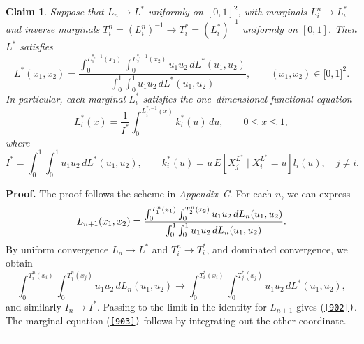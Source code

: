 \documentclass[onecolumn]{article}
\newtheorem{claim}[theorem]{Claim}
\newenvironment{proof}[1][Proof]{\noindent\textbf{#1.} }{\ \rule{0.5em}{0.5em}}
\begin{document}
\begin{claim}
\label{limit-FE} Suppose that $L_{n}\rightarrow L^{\ast }$ uniformly on $%
[0,1]^{2}$, with marginals $L_{i}^{n}\rightarrow L_{i}^{\ast }$ and inverse
marginals $T_{i}^{n}=(L_{i}^{n})^{-1}\rightarrow T_{i}^{\ast }=(L_{i}^{\ast
})^{-1}$ uniformly on $[0,1]$. Then $L^{\ast }$ satisfies 
\begin{equation}
L^{\ast }(x_{1},x_{2})=\frac{\int_{0}^{L_{1}^{\ast
,-1}(x_{1})}\int_{0}^{L_{2}^{\ast ,-1}(x_{2})}u_{1}u_{2}\,dL^{\ast
}(u_{1},u_{2})}{\int_{0}^{1}\int_{0}^{1}u_{1}u_{2}\,dL^{\ast }(u_{1},u_{2})}%
,\qquad (x_{1},x_{2})\in \lbrack 0,1]^{2}.  \label{902}
\end{equation}%
In particular, each marginal $L_{i}^{\ast }$ satisfies the one--dimensional
functional equation 
\begin{equation}
L_{i}^{\ast }(x)=\frac{1}{I^{\ast }}\int_{0}^{L_{i}^{\ast
,-1}(x)}k_{i}^{\ast }(u)\,du,\qquad 0\leq x\leq 1,  \label{903}
\end{equation}%
where 
\begin{equation}
I^{\ast }=\int_{0}^{1}\int_{0}^{1}u_{1}u_{2}\,dL^{\ast }(u_{1},u_{2}),\qquad
k_{i}^{\ast }(u)=u\,E[X_{j}^{L^{\ast }}\mid X_{i}^{L^{\ast
}}=u]l_{i}(u),\quad j\neq i.  \label{904}
\end{equation}
\end{claim}

\begin{proof}
The proof follows the scheme in \textit{Appendix~C}. For each $n$, we can
express 
\begin{equation}
L_{n+1}(x_{1},x_{2})=\frac{\int_{0}^{T_{1}^{n}(x_{1})}%
\int_{0}^{T_{2}^{n}(x_{2})}u_{1}u_{2}\,dL_{n}(u_{1},u_{2})}{%
\int_{0}^{1}\int_{0}^{1}u_{1}u_{2}\,dL_{n}(u_{1},u_{2})}.  \label{905}
\end{equation}%
By uniform convergence $L_{n}\rightarrow L^{\ast }$ and $T_{i}^{n}%
\rightarrow T_{i}^{\ast }$, and dominated convergence, we obtain 
\begin{equation}
\int_{0}^{T_{i}^{n}(x_{i})}\int_{0}^{T_{j}^{n}(x_{j})}u_{1}u_{2}%
\,dL_{n}(u_{1},u_{2})\rightarrow \int_{0}^{T_{i}^{\ast
}(x_{i})}\int_{0}^{T_{j}^{\ast }(x_{j})}u_{1}u_{2}\,dL^{\ast }(u_{1},u_{2}),
\label{906}
\end{equation}%
and similarly $I_{n}\rightarrow I^{\ast }$. Passing to the limit in the
identity for $L_{n+1}$ gives (\texttt{\textup{\ref{902})}}. The marginal
equation (\texttt{\textup{\ref{903})}} follows by integrating out the other
coordinate.
\end{proof}
\end{document}
